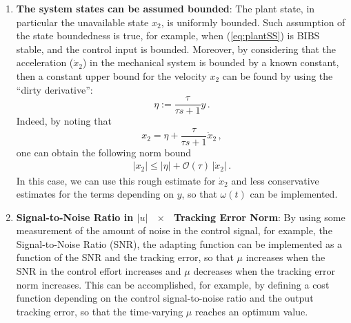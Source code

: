 \documentclass[letterpaper, 10 pt, conference]{ieeeconf}  %
\theoremstyle{plain}
\theoremstyle{definition}
\theoremstyle{remark}
\begin{document}
\begin{enumerate}
\begin{enumerate}
\item {\bf The system states can be assumed bounded}: The plant state, in particular the unavailable state $x_2$, is uniformly bounded. Such assumption of the state boundedness is true, for example, when (\ref{eq:plantSS}) is BIBS stable, and the control input is bounded. Moreover, by considering that the acceleration ($\dot{x}_2$) in the mechanical system is bounded by a known constant, then a constant  upper bound for the velocity $x_2$ can be found by using the ``dirty derivative'':
%
\begin{equation}
\eta := \frac{\tau}{\tau s+1} y\,.
\end{equation}
%
Indeed, by noting that 
%
\begin{equation}
x_2=\eta + \frac{\tau}{\tau s+1} \dot{x}_2\,,
\end{equation}
%
one can obtain the following norm bound  
%
\begin{align}
	|x_2| \leq |\eta| + \mathcal{O}(\tau) \, |\dot{x}_2| \, .
\end{align}
%
In this case, we can use this rough estimate for $\dot{x}_2$ and less conservative estimates for the terms depending on $y$, so that $\omega(t)$ can be implemented.


\item {\bf Signal-to-Noise Ratio in $|u|$ \  $\times$ \ Tracking Error Norm}: By using some measurement of the amount of noise in the control signal, for example, the Signal-to-Noise Ratio (SNR), the adapting function can be implemented as a function of the SNR and the tracking error, so that $\mu$ increases when the SNR in the control effort increases and $\mu$ decreases when the tracking error norm increases. This can be accomplished, for example, by defining a cost function depending on the control signal-to-noise ratio and the output tracking error, so that the time-varying $\mu$ reaches an optimum value.
\end{enumerate}

 
\end{enumerate}



\end{document}

